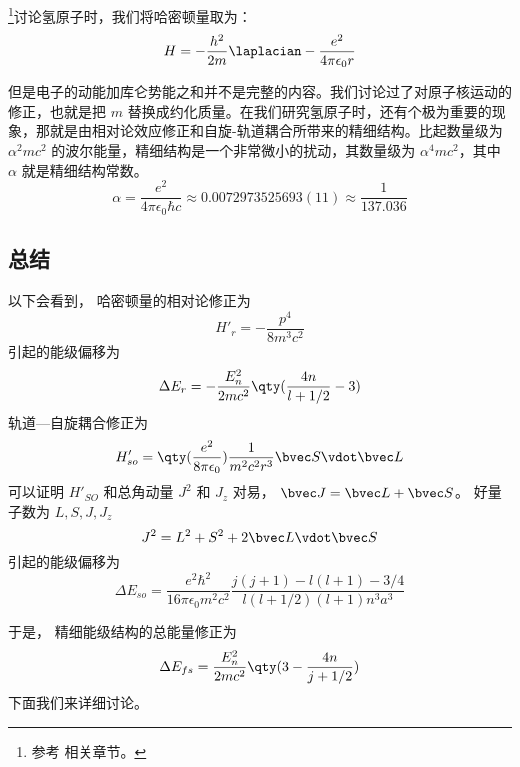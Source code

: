 
\begin{issues}
\issueDraft
\end{issues}

\footnote{参考 \cite{GriffQ} 相关章节。}讨论氢原子时，我们将哈密顿量取为：\begin{equation}
H=-\frac{h^2}{2m}\laplacian-\frac{e^2}{4\pi\epsilon_0 r}
\end{equation}

但是电子的动能加库仑势能之和并不是完整的内容。我们讨论过了对原子核运动的修正，也就是把 $m$ 替换成约化质量。在我们研究氢原子时，还有个极为重要的现象，那就是由相对论效应修正和自旋-轨道耦合所带来的精细结构。比起数量级为 $\alpha^2 mc^2$ 的波尔能量，精细结构是一个非常微小的扰动，其数量级为 $\alpha^4 mc^2$，其中 $\alpha$ 就是精细结构常数。
\begin{equation}
\alpha = \frac{e^2}{4\pi\epsilon_0\hbar c} \approx 0.0072973525693(11) \approx \frac{1}{137.036}
\end{equation}

\subsection{总结}
以下会看到， 哈密顿量的相对论修正为
\begin{equation}\label{eq_HfineS_2}
H'_r = -\frac{p^4}{8m^3 c^2}
\end{equation}
引起的能级偏移为
\begin{equation}
\Delta E_r = -\frac{E_n^2}{2mc^2} \qty(\frac{4n}{l+1/2}-3)
\end{equation}
轨道—自旋耦合修正为
\begin{equation}\label{eq_HfineS_3}
H'_{so} = \qty(\frac{e^2}{8\pi\epsilon_0}) \frac{1}{m^2c^2 r^3} \bvec S \vdot \bvec L
\end{equation}
可以证明 $H'_{SO}$ 和总角动量 $J^2$ 和 $J_z$ 对易， $\bvec J = \bvec L + \bvec S$。 好量子数为 $L, S, J, J_z$
\begin{equation}
J^2 = L^2 + S^2 + 2\bvec L \vdot \bvec S
\end{equation}
引起的能级偏移为
\begin{equation}
\Delta E_{so} = \frac{e^2\hbar^2}{16\pi\epsilon_0 m^2 c^2} \frac{j(j+1) - l(l+1) - 3/4}{l(l+1/2)(l+1)n^3 a^3}
\end{equation}

于是， 精细能级结构的总能量修正为
\begin{equation}
\Delta E_{fs} = \frac{E_n^2}{2mc^2}\qty(3 - \frac{4n}{j + 1/2})
\end{equation}
下面我们来详细讨论。

